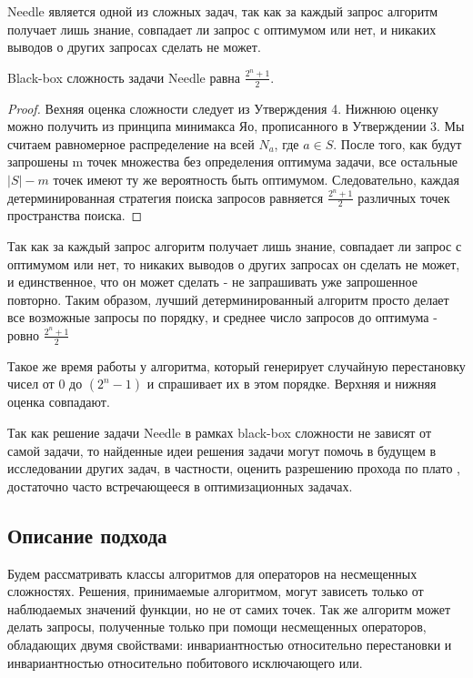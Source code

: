 Needle является одной из сложных задач, так как за каждый запрос алгоритм получает лишь знание, совпадает ли запрос с оптимумом или нет, и никаких выводов о других запросах сделать не может. 

\newtheorem{theorem}{Теорема}
\begin{myth}
Black-box сложность задачи Needle равна $\frac{2^n + 1}{2}$.
\end{myth}
\begin{proof}
    Вехняя оценка сложности следует из Утверждения 4. Нижнюю оценку можно получить из принципа минимакса Яо, прописанного в Утверждении 3. Мы считаем равномерное распределение на всей $N_a$, где $a \in S$. После того, как будут запрошены m точек множества без определения оптимума задачи, все остальные $|S| - m$ точек имеют ту же вероятность быть оптимумом. Следовательно, каждая детерминированная стратегия поиска запросов равняется $\frac{2^n + 1}{2}$ различных точек пространства поиска.
\end{proof}

Так как за каждый запрос алгоритм получает лишь знание, совпадает ли запрос с оптимумом или нет, то никаких выводов о других запросах он сделать не может, и единственное, что он может сделать - не запрашивать уже запрошенное повторно. Таким образом, лучший детерминированный алгоритм просто делает все возможные запросы по порядку, и среднее число запросов до оптимума - ровно $\frac{2^n + 1}{2}$

Такое же время работы у алгоритма, который генерирует случайную перестановку чисел от 0 до $(2^n - 1)$ и спрашивает их в этом порядке. Верхняя и нижняя оценка совпадают.

Так как решение задачи Needle в рамках black-box сложности не зависят от самой задачи, то найденные идеи решения задачи могут помочь в будущем в исследовании других задач, в частности, оценить разрешению прохода по плато \cite{6}, достаточно часто встречающееся в оптимизационных задачах. 

\subsection{Описание подхода}
Будем рассматривать классы алгоритмов для операторов на несмещенных сложностях. Решения, принимаемые алгоритмом, могут зависеть только от наблюдаемых значений функции, но не от самих точек. Так же алгоритм может делать  запросы, полученные только при помощи несмещенных операторов, обладающих двумя свойствами: инвариантностью относительно перестановки и инвариантностью относительно побитового исключающего или. 
	

